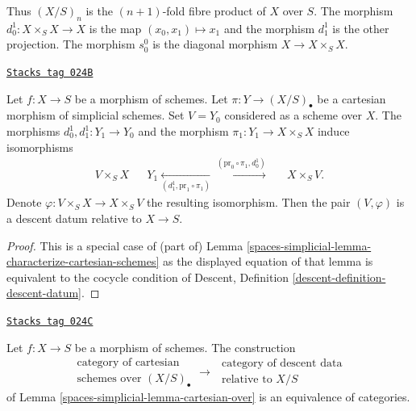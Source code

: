 Thus $(X/S)_n$ is the $(n + 1)$-fold fibre product of $X$ over $S$.
The morphism $d^1_0 : X \times_S X \to X$ is the map
$(x_0, x_1) \mapsto x_1$ and the morphism $d^1_1$ is the other
projection. The morphism $s^0_0$ is the diagonal morphism
$X \to X \times_S X$.

\begin{lemma}
\label{spaces-simplicial-lemma-cartesian-over}
\href{https://stacks.math.columbia.edu/tag/024B}{\texttt{Stacks tag 024B}}

Let $f : X \to S$ be a morphism of schemes.
Let $\pi : Y \to (X/S)_\bullet$ be a cartesian morphism
of simplicial schemes.
Set $V = Y_0$ considered as a scheme over $X$.
The morphisms $d^1_0, d^1_1 : Y_1 \to Y_0$ and the morphism
$\pi_1 : Y_1 \to X \times_S X$ induce isomorphisms
$$
\begin{array}{ccccc}V \times_S X &  & Y_1 \underset{(d^1_1, \text{pr}_1 \circ \pi_1)}{\longleftarrow}\overset{(\text{pr}_0 \circ \pi_1, d^1_0)}{\longrightarrow} &  & X \times_S V.\end{array}
$$
Denote $\varphi : V \times_S X \to X \times_S V$ the
resulting isomorphism.
Then the pair $(V, \varphi)$ is a descent datum relative
to $X \to S$.
\end{lemma}

\begin{proof}
This is a special case of (part of)
Lemma \ref{spaces-simplicial-lemma-characterize-cartesian-schemes}
as the displayed equation of that lemma is
equivalent to the cocycle condition of
Descent, Definition \ref{descent-definition-descent-datum}.
\end{proof}

\begin{lemma}
\label{spaces-simplicial-lemma-cartesian-equivalent-descent-datum}
\href{https://stacks.math.columbia.edu/tag/024C}{\texttt{Stacks tag 024C}}

Let $f : X \to S$ be a morphism of schemes. The construction
$$
\begin{matrix}
\text{category of cartesian } \\
\text{schemes over } (X/S)_\bullet
\end{matrix}
\longrightarrow
\begin{matrix}
\text{ category of descent data} \\
\text{ relative to } X/S
\end{matrix}
$$
of Lemma \ref{spaces-simplicial-lemma-cartesian-over}
is an equivalence of categories.
\end{lemma}

